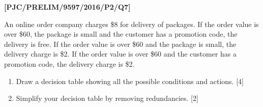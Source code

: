 \item \textbf{{[}PJC/PRELIM/9597/2016/P2/Q7{]} }

An online order company charges \$8 for delivery of packages. If the
order value is over \$60, the package is small and the customer has
a promotion code, the delivery is free. If the order value is over
\$60 and the package is small, the delivery charge is \$2. If the
order value is over \$60 and the customer has a promotion code, the
delivery charge is \$2. 
\begin{enumerate}
\item Draw a decision table showing all the possible conditions and actions.
\hfill{}{[}4{]}
\item Simplify your decision table by removing redundancies. \hfill{} {[}2{]}
\end{enumerate}
